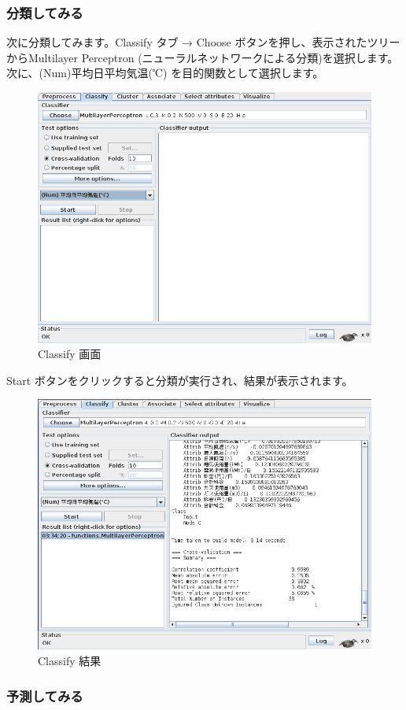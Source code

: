 \documentclass[mingoth,a4paper]{jsarticle}
\begin{document}
\subsubsection{分類してみる}

次に分類してみます。Classify タブ → Choose ボタンを押し、表示されたツリー
からMultilayer Perceptron (ニューラルネットワークによる分類)を選択します。
次に、(Num)平均日平均気温(℃) を目的関数として選択します。

\begin{figure}[H]
\begin{center}
\includegraphics[width=0.6\hsize]{image201003/weka6.png}
\caption{Classify 画面}
\end{center}
\end{figure}

Start ボタンをクリックすると分類が実行され、結果が表示されます。

\begin{figure}[H]
\begin{center}
\includegraphics[width=0.6\hsize]{image201003/weka7.png}
\caption{Classify 結果}
\end{center}
\end{figure}

\subsubsection{予測してみる}
\end{document}
